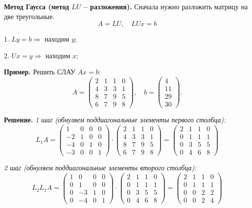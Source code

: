 \documentclass[9pt]{article}
\begin{document}
\par\textbf{Метод Гаусса (метод \(LU\) -- разложения).} Сначала нужно разложить матрицу на две треугольные.
\[A=LU,\quad LUx=b\]
\par1. \(Ly=b \Rightarrow\) находим \(y\);
\par2. \(Ux=y \Rightarrow\) находим \(x\);
\par\textbf{Пример.} Решить СЛАУ \(Ax=b\):
\[A = \left(
\begin{array}{cccc}
    2 & 1 & 1 & 0\\
    4 & 3 & 3 & 1\\
    8 & 7 & 9 & 5\\
    6 & 7 & 9 & 8
\end{array}
\right),\quad b=\left(
\begin{array}{c}
    4\\
    11\\
    29\\
    30
\end{array}
\right).\]
\par\textbf{Решение.} \textit{1 шаг (обнуляем поддиагональные элементы первого столбца):}
\[L_1A=\left(
\begin{array}{cccc}
    1 & 0 & 0 & 0\\
    -2 & 1 & 0 & 0\\
    -4 & 0 & 1 & 0\\
    -3 & 0 & 0 & 1
\end{array}
\right)\cdot\left(
\begin{array}{cccc}
    2 & 1 & 1 & 0\\
    4 & 3 & 3 & 1\\
    8 & 7 & 9 & 5\\
    6 & 7 & 9 & 8
\end{array}
\right)=\left(
\begin{array}{cccc}
    2 & 1 & 1 & 0\\
    0 & 1 & 1 & 1\\
    0 & 3 & 5 & 5\\
    0 & 4 & 6 & 8
\end{array}
\right)
\]
\par\textit{2 шаг (обнуляем поддиагональные элементы второго столбца):}
\[L_2L_1A=\left(
\begin{array}{cccc}
    1 & 0 & 0 & 0\\
    0 & 1 & 0 & 0\\
    0 & -3 & 1 & 0\\
    0 & -4 & 0 & 1
\end{array}
\right)\cdot\left(
\begin{array}{cccc}
    2 & 1 & 1 & 0\\
    0 & 1 & 1 & 1\\
    0 & 3 & 5 & 5\\
    0 & 4 & 6 & 8
\end{array}
\right)=\left(
\begin{array}{cccc}
    2 & 1 & 1 & 0\\
    0 & 1 & 1 & 1\\
    0 & 0 & 2 & 2\\
    0 & 0 & 2 & 4
\end{array}
\right)\]
\end{document}
